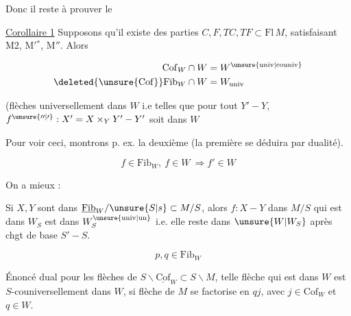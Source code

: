

Donc il reste à prouver le

\uline{Corollaire  1} Supposons qu'il existe des parties $C,F,TC,TF\subset\mathrm{Fl}\,M$, satisfaisant  M2, M$'{}^{*}$, M$''$. Alors


\[ \begin{aligned}\mathrm{Cof}_W\cap W&=W^{\unsure{\mathrm{univ}|\mathrm{couniv}}}\\ \deleted{\unsure{\mathrm{Cof}}}\mathrm{Fib}_W\cap W&=W_{\mathrm{univ}}\end{aligned} \]

(flèches  universellement dans $W$ i.e telles que pour tout $Y'-Y$, $f^{\unsure{\prime\prime|\prime}}:X'=X\times_Y Y'-Y'$ soit dans $W$

Pour voir ceci, montrons p. ex. la deuxième (la première  se déduira par dualité).


\[ f\in\mathrm{Fib}_W,\ f\in W\ \Longrightarrow f'\in W \]

On a mieux :

\uline{} \uline{}

 Si $X,Y$ sont dans $\underline{\mathrm{Fib}}_W/\unsure{S|s}\subset M/S$, alors  $f:X-Y$ dans $M/S$ qui est dans $W_S$ est dans $W_S^{\unsure{\mathrm{univ}|\mathrm{un}}}$ i.e. elle reste dans $\unsure{W|W_S}$ après  chgt de base $S'-S$.


\[ p,q\in\mathrm{Fib}_W \]

Énoncé dual pour les flèches de $S\backslash\underline{\mathrm{Cof}}_W\subset S\backslash M$,  telle flèche qui est dans $W$ est $S$-couniversellement dans $W$, si  flèche de $M$ se factorise en $qj$, avec $j\in\mathrm{Cof}_W$ et $q\in W$.


